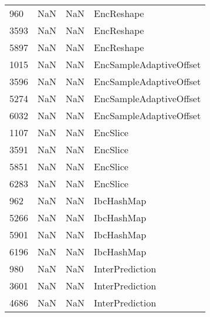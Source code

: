 \begin{tabular}{llll}
960  &                   NaN &                        NaN &                                EncReshape \\
3593 &                   NaN &                        NaN &                                EncReshape \\
5897 &                   NaN &                        NaN &                                EncReshape \\
1015 &                   NaN &                        NaN &                   EncSampleAdaptiveOffset \\
3596 &                   NaN &                        NaN &                   EncSampleAdaptiveOffset \\
5274 &                   NaN &                        NaN &                   EncSampleAdaptiveOffset \\
6032 &                   NaN &                        NaN &                   EncSampleAdaptiveOffset \\
1107 &                   NaN &                        NaN &                                  EncSlice \\
3591 &                   NaN &                        NaN &                                  EncSlice \\
5851 &                   NaN &                        NaN &                                  EncSlice \\
6283 &                   NaN &                        NaN &                                  EncSlice \\
962  &                   NaN &                        NaN &                                IbcHashMap \\
5266 &                   NaN &                        NaN &                                IbcHashMap \\
5901 &                   NaN &                        NaN &                                IbcHashMap \\
6196 &                   NaN &                        NaN &                                IbcHashMap \\
980  &                   NaN &                        NaN &                           InterPrediction \\
3601 &                   NaN &                        NaN &                           InterPrediction \\
4686 &                   NaN &                        NaN &                           InterPrediction \\

\end{tabular}

